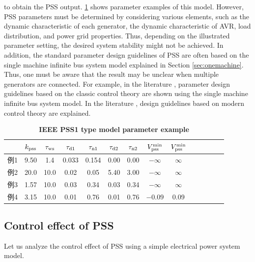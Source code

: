 \documentclass[tombow,dvipdfmx]{corona-a5-1.1}
\begin{document}
to obtain the PSS output.
\ref{table:psspara} shows parameter examples of this model.
However, PSS parameters must be determined by considering various elements, such as the dynamic characteristic of each generator, the dynamic characteristic of AVR, load distribution, and power grid properties.
Thus, depending on the illustrated parameter setting, the desired system stability might not be achieved.
In addition, the standard parameter design guidelines of PSS are often based on the single machine infinite bus system model explained in Section \ref{sec:onemachine}.
Thus, one must be aware that the result may be unclear when multiple generators are connected.
For example, in the literature \cite[Section 12.5]{kundur1994power}, parameter design guidelines based on the classic control theory are shown using the single machine infinite bus system model.
In the literature \cite{chow2004power}, design guidelines based on modern control theory are explained.

\begin{table}[h]
\medskip
 \caption{\textbf{IEEE PSS1 type model parameter example}}
 \label{table:psspara}
 \centering
  \begin{tabular}{lccccccccccccc}
   \hline
 &  $k_{\rm pss}$ & $\tau_{\rm ws}$ & $\tau_{{\rm d}1}$ & $\tau_{{\rm n}1}$ & $\tau_{{\rm d}2}$ & $\tau_{{\rm n}2}$ & $V_{\rm pss}^{\rm min}$ & $V_{\rm pss}^{\rm min}$ \\
   \hline \hline
   例1 \cite[12.5節]{kundur1994power}& 9.50 & 1.4 & 0.033 & 0.154 & 0.00 & 0.00 & $-\infty$ & $\infty$ \\
   例2 \cite[12.8節]{kundur1994power}& 20.0 & 10.0 & 0.02 & 0.05 & 5.40 & 3.00 & $-\infty$ & $\infty$ \\
   例3 \cite[III節]{chow2004power}& 1.57 & 10.0 & 0.03 & 0.34 & 0.03 & 0.34 & $-\infty$ & $\infty$ \\
   例4 \cite[Table H.3]{ieee2016ieee}& 3.15 & 10.0 & 0.01 & 0.76 & 0.01 & 0.76 & $-0.09$ & 0.09\\
   \hline
  \end{tabular}
\end{table}

\subsection{Control effect of PSS}\label{sec:pssov}

Let us analyze the control effect of PSS using a simple electrical power system model.
\end{document}
